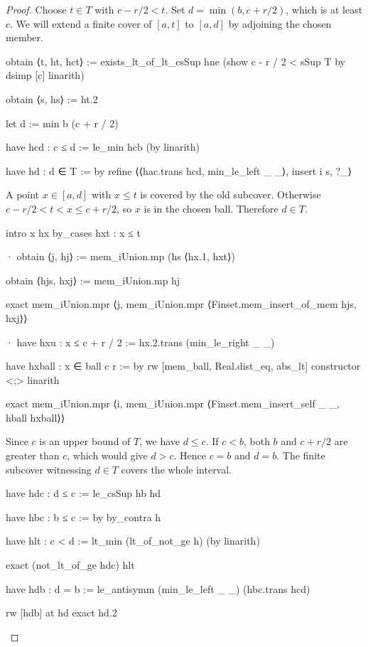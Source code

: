\begin{proof}
  Choose $t\in T$ with $c-r/2<t$.
  Set $d=\min(b,c+r/2)$, which is at least $c$.
  We will extend a finite cover of $[a,t]$ to $[a,d]$ by adjoining the chosen member.

  \begin{lean}
    obtain ⟨t, ht, hct⟩ := exists_lt_of_lt_csSup hne (show c - r / 2 < sSup T by
      dsimp [c]
      linarith)

    obtain ⟨s, hs⟩ := ht.2

    let d := min b (c + r / 2)

    have hcd : c ≤ d := le_min hcb (by linarith)

    have hd : d ∈ T := by
      refine ⟨⟨hac.trans hcd, min_le_left _ _⟩, insert i s, ?_⟩
  \end{lean}

  A point $x\in[a,d]$ with $x\leq t$ is covered by the old subcover.
  Otherwise $c-r/2<t<x\leq c+r/2$, so $x$ is in the chosen ball.
  Therefore $d\in T$.

  \begin{lean}
    intro x hx
    by_cases hxt : x ≤ t

    · obtain ⟨j, hj⟩ := mem_iUnion.mp (hs ⟨hx.1, hxt⟩)

      obtain ⟨hjs, hxj⟩ := mem_iUnion.mp hj

      exact mem_iUnion.mpr ⟨j, mem_iUnion.mpr ⟨Finset.mem_insert_of_mem hjs, hxj⟩⟩

    · have hxu : x ≤ c + r / 2 := hx.2.trans (min_le_right _ _)

      have hxball : x ∈ ball c r := by
        rw [mem_ball, Real.dist_eq, abs_lt]
        constructor <;> linarith

      exact mem_iUnion.mpr ⟨i, mem_iUnion.mpr ⟨Finset.mem_insert_self _ _, hball hxball⟩⟩
  \end{lean}

  Since $c$ is an upper bound of $T$, we have $d\leq c$.
  If $c<b$, both $b$ and $c+r/2$ are greater than $c$, which would give $d>c$.
  Hence $c=b$ and $d=b$.
  The finite subcover witnessing $d\in T$ covers the whole interval.

  \begin{lean}
    have hdc : d ≤ c := le_csSup hb hd

    have hbc : b ≤ c := by
      by_contra h

      have hlt : c < d := lt_min (lt_of_not_ge h) (by linarith)

      exact (not_lt_of_ge hdc) hlt

    have hdb : d = b := le_antisymm (min_le_left _ _) (hbc.trans hcd)

    rw [hdb] at hd
    exact hd.2
  \end{lean}

\end{proof}

